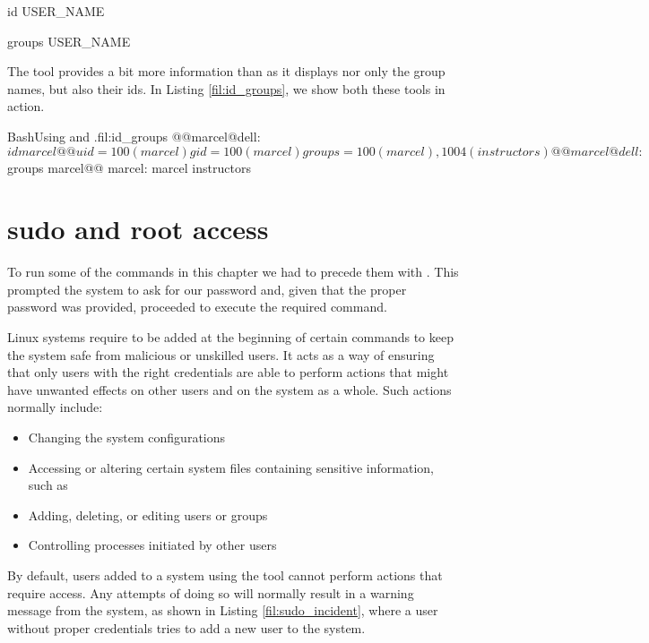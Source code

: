 \begin{command_line}
id USER_NAME
\end{command_line}

\begin{command_line}
groups USER_NAME
\end{command_line}

The  tool provides a bit more information than  as it displays nor only the group names, but also their ids. In Listing \ref{fil:id_groups}, we show both these tools in action.

\begin{command_line_float}{Bash}{Using  and .}{fil:id_groups}
@@marcel@dell:~$id marcel@@
uid=100(marcel) gid=100(marcel) groups=100(marcel),1004(instructors)
@@marcel@dell:~$groups marcel@@
marcel: marcel instructors
\end{command_line_float}


\section{sudo and root access}
\label{sec:sudo}

To run some of the commands in this chapter we had to precede them with . This prompted the system to ask for our password and, given that the proper password was provided, proceeded to execute the required command.

Linux systems require  to be added at the beginning of certain commands to keep the system safe from malicious or unskilled users. It acts as a way of ensuring that only users with the right credentials are able to perform actions that might have unwanted effects on other users and on the system as a whole. Such actions normally include:

\begin{itemize}
\item Changing the system configurations
\item Accessing or altering certain system files containing sensitive information, such as 
\item Adding, deleting, or editing users or groups
\item Controlling processes initiated by other users
\end{itemize}

By default, users added to a system using the  tool cannot perform actions that require  access. Any attempts of doing so will normally result in a warning message from the system, as shown in Listing \ref{fil:sudo_incident}, where a user without proper  credentials tries to add a new user to the system.

